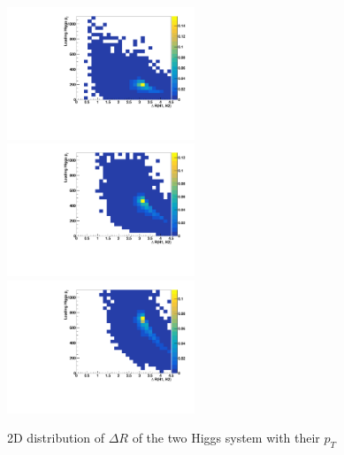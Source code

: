 \begin{figure}[htb]
  \centering
  \includegraphics[width=0.5\textwidth]{Images/ResonantHH/gen_deltaR_H1_H2_Vs_LeadingH_PT_M0500.pdf}%
  \includegraphics[width=0.5\textwidth]{Images/ResonantHH/gen_deltaR_H1_H2_Vs_LeadingH_PT_M1000.pdf}\\
  \includegraphics[width=0.5\textwidth]{Images/ResonantHH/gen_deltaR_H1_H2_Vs_LeadingH_PT_M1500.pdf}
\caption{2D distribution of $\Delta R$ of the two Higgs system with their $p_T$} \label{fig:diagram}
\end{figure}

